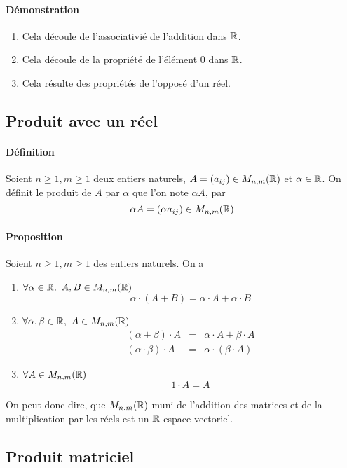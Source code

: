 \paragraph{Démonstration} \begin{enumerate}
\item Cela découle de l'associativié de l'addition dans $\mathbb{R}$.
\item Cela découle de la propriété de l'élément $0$ dans $\mathbb{R}$.
\item Cela résulte des propriétés de l'opposé d'un réel.
\end{enumerate}

%
\subsection{Produit avec un réel}
%
\paragraph{Définition} Soient $n \geq 1, m \geq 1$ deux entiers naturels, $A = (a_{ij}) \in M_{n, m}(\mathbb{R})$ et $\alpha \in \mathbb{R}$. On  définit le produit de $A$ par $\alpha$ que l'on note $\alpha A$, par
$$\alpha A = (\alpha a_{ij}) \in M_{n, m}(\mathbb{R})$$

\paragraph{Proposition} Soient $n \geq 1, m \geq 1$ des entiers naturels. On a
\begin{enumerate}
  \item $\forall \alpha \in \mathbb{R}, ~ A, B \in M_{n, m}(\mathbb{R})$ 
    $$\alpha \cdot (A + B) = \alpha \cdot A + \alpha \cdot B$$
    
  \item $\forall \alpha, \beta \in \mathbb{R}, ~ A \in M_{n, m}(\mathbb{R})$
    \begin{eqnarray*}
      (\alpha + \beta) \cdot A &=& \alpha \cdot A + \beta \cdot A \\
      (\alpha \cdot \beta) \cdot A &=& \alpha \cdot (\beta \cdot A)
    \end{eqnarray*}
    
  \item $\forall A \in M_{n, m}(\mathbb{R})$
    $$1 \cdot A = A$$
\end{enumerate}
On peut donc dire, que $M_{n, m}(\mathbb{R})$ muni de l'addition des matrices et de la multiplication par les réels est un $\mathbb{R}$-espace vectoriel.

%
\subsection{Produit matriciel}
%
